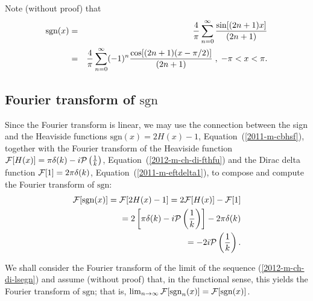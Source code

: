 Note (without proof) that
\begin{eqnarray}
\mbox{sgn}(x)
&=&{4\over \pi }\sum_{n=0}^\infty {\sin [
(2n+1)x]\over
(2n+1)}\\
&=&{4\over \pi }\sum_{n=0}^\infty (-1)^n{\cos [
(2n+1)(x-\pi /2)]\over
(2n+1)}\;,\; -\pi <x<\pi  .
 \end{eqnarray}




\subsection{Fourier transform of $\textrm{sgn}$}

Since the Fourier transform is linear,
we may use the connection between the sign and the Heaviside functions $\textrm{sgn}(x) = 2H(x) -1$, Equation~(\ref{2011-m-cbhsf}),
together with the
Fourier transform of the Heaviside function
${\cal F}[H(x)] =  \pi \delta (k)   -i {\cal P} \left(\frac{1}{k}\right)$,
Equation~(\ref{2012-m-ch-di-fthfu}) and the Dirac delta function
${\cal F}[1] = 2\pi \delta (k)$, Equation~(\ref{2011-m-eftdelta1}),
to compose and compute the Fourier transform  of $\textrm{sgn}$:
\begin{equation}
\begin{split}
{\cal F}[\textrm{sgn}(x)] = {\cal F}[2H(x) -1] = 2{\cal F}[H(x)] - {\cal F}[1]
\\   =
2 \left[\pi \delta (k)   -i {\cal P} \left(\frac{1}{k}\right)\right] -  2\pi \delta (k)
\\   =
-2i {\cal P} \left(\frac{1}{k}\right)
.
\end{split}
\label{2011-m-ch-di-fdsgnfu}
\end{equation}

We shall consider the Fourier transform of the limit of the sequence (\ref{2012-m-ch-di-lsegn})
and assume (without proof) that, in the functional sense,
this yields the   Fourier transform of $\textrm{sgn}$; that is,
$
\lim_{n\rightarrow \infty}
{\cal F}[ \textrm{sgn}_n(x) ]
=
{\cal F}[ \textrm{sgn}(x) ]
$.

